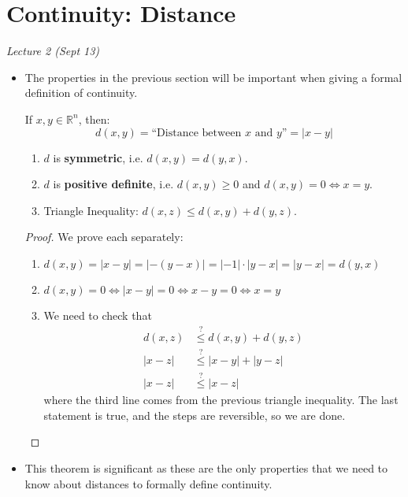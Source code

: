 \section{Continuity: Distance}
\textit{Lecture 2 (Sept 13)}
\begin{itemize}
    \item The properties in the previous section will be important when giving a formal definition of continuity.
    \begin{definition}
        If $x,y\in \mathbb{R}^n$, then:
        \begin{equation}
            d(x,y) = \text{``Distance between $x$ and $y$''} = |x-y|
        \end{equation}
    \end{definition}
    \begin{theorem}
        \begin{enumerate}
            \item $d$ is \textbf{symmetric}, i.e. $d(x,y)=d(y,x)$.
            \item $d$ is \textbf{positive definite}, i.e. $d(x,y) \ge 0$ and $d(x,y)=0 \iff x=y$.
            \item Triangle Inequality: $d(x,z) \le d(x,y) + d(y,z).$
        \end{enumerate}
    \end{theorem}
    \begin{proof}
        We prove each separately:
        \begin{enumerate}
            \item $d(x,y) = |x-y| = |-(y-x)| = |-1| \cdot |y-x| = |y-x| = d(y,x)$
            \item $d(x,y) = 0 \iff |x-y| = 0 \iff x-y = 0 \iff x=y$
            \item We need to check that
            \begin{align}
                d(x,z) &\stackrel{?}{\le} d(x,y) + d(y,z) \\ 
                |x-z| &\stackrel{?}{\le} |x-y| + |y-z| \\ 
                |x-z| &\stackrel{?}{\le} |x-z|
            \end{align}
            where the third line comes from the previous triangle inequality. The last statement is true, and the steps are reversible, so we are done.
        \end{enumerate}
    \end{proof}
    \item This theorem is significant as these are the only properties that we need to know about distances to formally define continuity.


\end{itemize}
